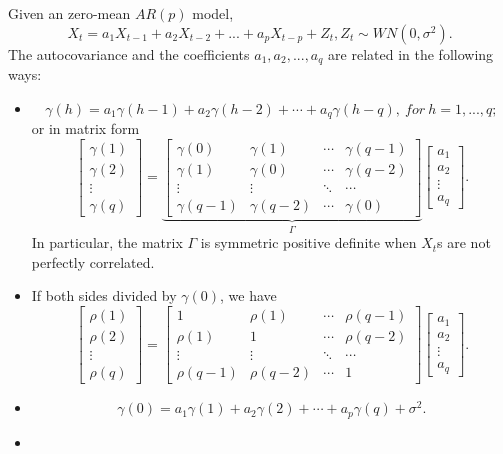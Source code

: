 \begin{theorem}\label{ch:time-series-analysis:YuleWalderEquationForAR(q)}
Given an zero-mean $AR(p)$ model,
$$X_t = a_1 X_{t-1} + a_2 X_{t-2} + ... + a_p X_{t-p} + Z_t, Z_t\sim WN(0,\sigma^2).$$
The autocovariance and the coefficients $a_1,a_2,...,a_q$ are related in the following ways:
\begin{itemize}
	\item $$\gamma(h) = a_1\gamma(h-1) + a_2\gamma(h-2) + \cdots + a_q \gamma(h-q), ~for~ h=1,...,q;$$
	or in matrix form
	$$
	\begin{bmatrix}
	\gamma(1)\\
	\gamma(2)\\
	\vdots\\
	\gamma(q)
	\end{bmatrix} = \underbrace{\begin{bmatrix}
	\gamma(0) & \gamma(1) & \cdots & \gamma(q-1)\\ 
	\gamma(1) & \gamma(0) & \cdots & \gamma(q-2)\\ 
	\vdots & \vdots & \ddots & \cdots\\ 
	\gamma(q-1) & \gamma(q-2) & \cdots & \gamma(0) 
	\end{bmatrix}}_\Gamma \begin{bmatrix}
	a_1\\
	a_2\\
	\vdots\\
	a_q
	\end{bmatrix}.$$
	In particular, the matrix $\Gamma$ is symmetric positive definite when $X_t$s are not perfectly correlated. 
	\item If both sides divided by $\gamma(0)$, we have
	$$
	\begin{bmatrix}
	\rho(1)\\
	\rho(2)\\
	\vdots\\
	\rho(q)
	\end{bmatrix} = \begin{bmatrix}
	1 & \rho(1) & \cdots & \rho(q-1)\\ 
	\rho(1) & 1 & \cdots & \rho(q-2)\\ 
	\vdots & \vdots & \ddots & \cdots\\ 
	\rho(q-1) & \rho(q-2) & \cdots & 1 
	\end{bmatrix} \begin{bmatrix}
	a_1\\
	a_2\\
	\vdots\\
	a_q
	\end{bmatrix}.$$
	\item $$\gamma(0) = a_1\gamma(1) + a_2\gamma(2) + \cdots + a_p\gamma(q) + \sigma^2.$$
	\item 
\end{itemize} 	
\end{theorem}
